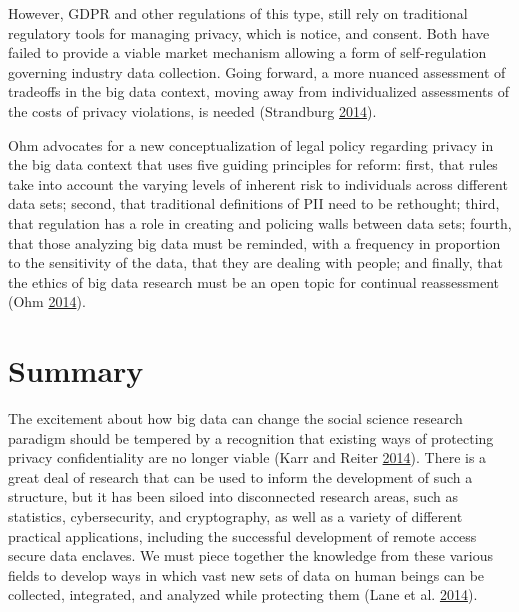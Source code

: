 \documentclass[]{krantz}
\begin{document}
However, GDPR and other regulations of this type, still rely on
traditional regulatory tools for managing privacy, which is notice, and
consent. Both have failed to provide a viable market mechanism allowing
a form of self-regulation governing industry data collection. Going
forward, a more nuanced assessment of tradeoffs in the big data context,
moving away from individualized assessments of the costs of privacy
violations, is needed (Strandburg
\protect\hyperlink{ref-Strandburg2014}{2014}).

Ohm advocates for a new conceptualization of legal policy regarding
privacy in the big data context that uses five guiding principles for
reform: first, that rules take into account the varying levels of
inherent risk to individuals across different data sets; second, that
traditional definitions of PII need to be rethought; third, that
regulation has a role in creating and policing walls between data sets;
fourth, that those analyzing big data must be reminded, with a frequency
in proportion to the sensitivity of the data, that they are dealing with
people; and finally, that the ethics of big data research must be an
open topic for continual reassessment (Ohm
\protect\hyperlink{ref-Ohm2014}{2014}).

\section{Summary}\label{summary-7}

The excitement about how big data can change the social science research
paradigm should be tempered by a recognition that existing ways of
protecting privacy confidentiality are no longer viable (Karr and Reiter
\protect\hyperlink{ref-karr2014analytical}{2014}). There is a great deal
of research that can be used to inform the development of such a
structure, but it has been siloed into disconnected research areas, such
as statistics, cybersecurity, and cryptography, as well as a variety of
different practical applications, including the successful development
of remote access secure data enclaves. We must piece together the
knowledge from these various fields to develop ways in which vast new
sets of data on human beings can be collected, integrated, and analyzed
while protecting them (Lane et al.
\protect\hyperlink{ref-lane2014}{2014}).
\end{document}
